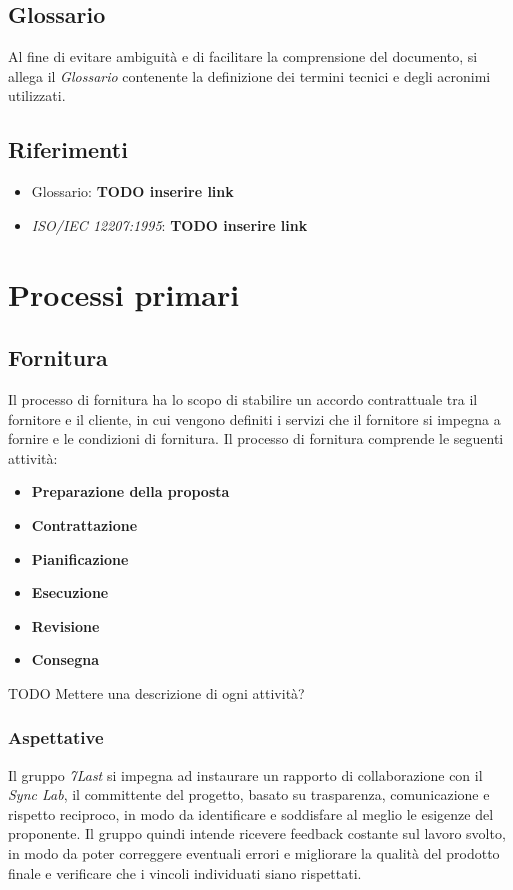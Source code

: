 \documentclass[italian,12pt]{article} %
\begin{document}
\subsection{Glossario}
Al fine di evitare ambiguità e di facilitare la comprensione del documento, si allega il \textit{Glossario} contenente la definizione dei termini tecnici e degli acronimi utilizzati.

\subsection{Riferimenti}
\begin{itemize}
	\item Glossario: \textbf{TODO inserire link}
	\item \textit{ISO/IEC 12207:1995}: \textbf{TODO inserire link}
\end{itemize}


\section{Processi primari}
\subsection{Fornitura}
Il processo di fornitura ha lo scopo di stabilire un accordo contrattuale tra il fornitore e il cliente, in cui vengono definiti i servizi che il fornitore si impegna a fornire e le condizioni di fornitura. 
Il processo di fornitura comprende le seguenti attività:
\begin{itemize}
	\itemsep0em
	\item \textbf{Preparazione della proposta}
	\item \textbf{Contrattazione}
	\item \textbf{Pianificazione}
	\item \textbf{Esecuzione}
	\item \textbf{Revisione}
	\item \textbf{Consegna}
\end{itemize}
TODO Mettere una descrizione di ogni attività?

\subsubsection{Aspettative}
Il gruppo \textit{7Last} si impegna ad instaurare un rapporto di collaborazione con il \textit{Sync Lab}, il committente del progetto, basato su trasparenza, comunicazione e rispetto reciproco, in modo da identificare e soddisfare al meglio le esigenze del proponente.
Il gruppo quindi intende ricevere feedback costante sul lavoro svolto, in modo da poter correggere eventuali errori e migliorare la qualità del prodotto finale e verificare che i vincoli individuati siano rispettati.
\end{document}
